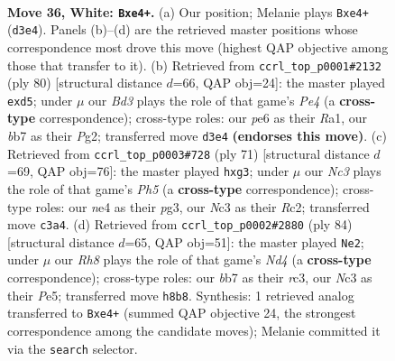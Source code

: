 \documentclass[11pt]{article}
\begin{document}
\clearpage

\begin{figure}[p]\centering
\begin{subfigure}{0.46\textwidth}\centering
\resizebox{\linewidth}{!}{%
\newchessgame
\chessboard[
  setfen={7R/1b3pp1/4p1k1/1p5p/1r1PnP1P/2NBP1P1/8/6K1 w - - 10 36},
  showmover=false,
  pgfstyle=straightmove, color=movearrow, markmove={d3-e4}
]}
\caption{}
\end{subfigure}\hfill
\begin{subfigure}{0.46\textwidth}\centering
\resizebox{\linewidth}{!}{%
\newchessgame
\chessboard[
  setfen={2bk1r2/2p5/p2p4/3n2p1/4P2p/5N1P/1PP2KP1/R7 w - - 0 41},
  showmover=false,
  pgfstyle=straightmove, color=movearrow, markmove={e4-d5}
]}
\caption{}
\end{subfigure}
\\[4pt]
\begin{subfigure}{0.46\textwidth}\centering
\resizebox{\linewidth}{!}{%
\newchessgame
\chessboard[
  setfen={6k1/1p3p2/p5p1/P2p1p2/1P1P3p/4b1P1/2r2NBP/5RK1 b - - 1 36},
  showmover=false,
  pgfstyle=straightmove, color=movearrow, markmove={h4-g3}
]}
\caption{}
\end{subfigure}\hfill
\begin{subfigure}{0.46\textwidth}\centering
\resizebox{\linewidth}{!}{%
\newchessgame
\chessboard[
  setfen={2R5/2n2k2/4pppp/1p2P3/1P1N3P/P1r3P1/5K2/8 w - - 2 43},
  showmover=false,
  pgfstyle=straightmove, color=movearrow, markmove={d4-e2}
]}
\caption{}
\end{subfigure}
\caption{\textbf{Move 36, White: \texttt{Bxe4+}.} (a) Our position; Melanie plays \texttt{Bxe4+} (\texttt{d3e4}). Panels (b)--(d) are the retrieved master positions whose correspondence most drove this move (highest QAP objective among those that transfer to it). (b) Retrieved from \texttt{ccrl\_top\_p0001\#2132} (ply 80) [structural distance $d$=66, QAP obj=24]: the master played \texttt{exd5}; under $\mu$ our \emph{Bd3} plays the role of that game's \emph{Pe4} (a \textbf{cross-type} correspondence); cross-type roles: our \emph{p}e6 as their \emph{R}a1, our \emph{b}b7 as their \emph{P}g2; transferred move \texttt{d3e4} \textbf{(endorses this move)}. (c) Retrieved from \texttt{ccrl\_top\_p0003\#728} (ply 71) [structural distance $d$=69, QAP obj=76]: the master played \texttt{hxg3}; under $\mu$ our \emph{Nc3} plays the role of that game's \emph{Ph5} (a \textbf{cross-type} correspondence); cross-type roles: our \emph{n}e4 as their \emph{p}g3, our \emph{N}c3 as their \emph{R}c2; transferred move \texttt{c3a4}. (d) Retrieved from \texttt{ccrl\_top\_p0002\#2880} (ply 84) [structural distance $d$=65, QAP obj=51]: the master played \texttt{Ne2}; under $\mu$ our \emph{Rh8} plays the role of that game's \emph{Nd4} (a \textbf{cross-type} correspondence); cross-type roles: our \emph{b}b7 as their \emph{r}c3, our \emph{N}c3 as their \emph{P}e5; transferred move \texttt{h8b8}. Synthesis: 1 retrieved analog transferred to \texttt{Bxe4+} (summed QAP objective 24, the strongest correspondence among the candidate moves); Melanie committed it via the \texttt{search} selector.}
\label{fig:thought-m70}
\end{figure}
\end{document}
